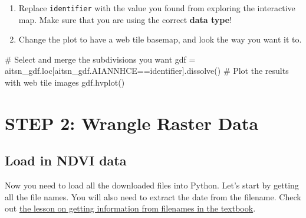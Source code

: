 \documentclass[
  letterpaper,
  DIV=11,
  numbers=noendperiod,
  oneside]{scrreprt}
\newenvironment{Shaded}{\begin{snugshade}}{\end{snugshade}}
\newcommand{\CommentTok}[1]{\textcolor[rgb]{0.37,0.37,0.37}{#1}}
\newcommand{\NormalTok}[1]{\textcolor[rgb]{0.00,0.23,0.31}{#1}}
\newcommand{\OperatorTok}[1]{\textcolor[rgb]{0.37,0.37,0.37}{#1}}
\providecommand{\tightlist}{%
  \setlength{\itemsep}{0pt}\setlength{\parskip}{0pt}}
\begin{document}
\begin{tcolorbox}[enhanced jigsaw, colbacktitle=quarto-callout-color!10!white, opacityback=0, bottomtitle=1mm, toptitle=1mm, bottomrule=.15mm, left=2mm, colframe=quarto-callout-color-frame, leftrule=.75mm, opacitybacktitle=0.6, colback=white, rightrule=.15mm, toprule=.15mm, breakable, titlerule=0mm, title=\textcolor{quarto-callout-color}{\faInfo}\hspace{0.5em}{Try It}, coltitle=black, arc=.35mm]

\begin{enumerate}
\def\labelenumi{\arabic{enumi}.}
\tightlist
\item
  Replace \texttt{identifier} with the value you found from exploring
  the interactive map. Make sure that you are using the correct
  \textbf{data type}!
\item
  Change the plot to have a web tile basemap, and look the way you want
  it to.
\end{enumerate}

\end{tcolorbox}

\begin{Shaded}
\begin{Highlighting}[]
\CommentTok{\# Select and merge the subdivisions you want}
\NormalTok{gdf }\OperatorTok{=}\NormalTok{ aitsn\_gdf.loc[aitsn\_gdf.AIANNHCE}\OperatorTok{==}\NormalTok{identifier].dissolve()}
\CommentTok{\# Plot the results with web tile images}
\NormalTok{gdf.hvplot()}
\end{Highlighting}
\end{Shaded}


\chapter{STEP 2: Wrangle Raster Data}\label{step-2-wrangle-raster-data}

\section{Load in NDVI data}\label{load-in-ndvi-data}

Now you need to load all the downloaded files into Python. Let's start
by getting all the file names. You will also need to extract the date
from the filename. Check out
\href{https://www.earthdatascience.org/courses/intro-to-earth-data-science/write-efficient-python-code/loops/data-workflows-with-loops/}{the
lesson on getting information from filenames in the textbook}.
\end{document}
